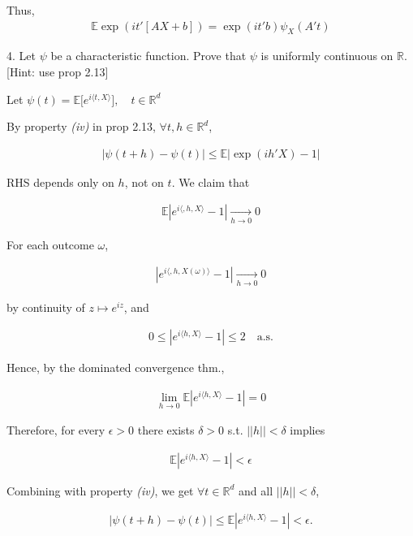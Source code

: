 \documentclass[10pt]{article}
\begin{document}
Thus,
\begin{gather*}
    \mathbb{E} \exp (it'[AX + b]) = \exp(it'b)\psi_X(A't)
\end{gather*}

\newpage

4. Let $\psi$ be a characteristic function. Prove that $\psi$ is uniformly continuous on $\mathbb{R}$. [Hint: use prop 2.13]

Let $\psi(t) = \mathbb{E}\big[e^{i\langle t, X\rangle}\big], \quad t \in \mathbb{R}^d$

By property \textit{(iv)} in prop 2.13, $\forall t, h \in \mathbb{R}^d$,

\begin{gather*}
    |\psi(t + h) - \psi(t)| \leq \mathbb{E}| \exp (ih'X) - 1|
\end{gather*}

RHS depends only on $h$, not on $t$. We claim that 

\begin{gather*}
    \mathbb{E}|e^{i\langle, h, X \rangle} - 1| \xrightarrow[h \to 0]{} 0
\end{gather*}

For each outcome $\omega$, 

\begin{gather*}
    |e^{i\langle, h, X(\omega) \rangle} - 1|\xrightarrow[h \to 0]{} 0
\end{gather*}

by continuity of $z \mapsto e^{iz}$, and 

\begin{gather*}
    0 \leq |e^{i \langle h, X\rangle} - 1| \leq 2 \quad\text{a.s.}
\end{gather*}

Hence, by the dominated convergence thm., 

\begin{gather*}
    \lim_{h \to 0}\mathbb{E}|e^{i \langle h, X\rangle} - 1| = 0
\end{gather*}

Therefore, for every $\epsilon > 0$ there exists $\delta > 0$ s.t. $||h|| < \delta$ implies

\begin{gather*}
    \mathbb{E}|e^{i \langle h, X\rangle} - 1| < \epsilon
\end{gather*}

Combining with property \textit{(iv)}, we get $\forall t \in \mathbb{R}^d$ and all $||h|| < \delta$,

\begin{gather*}
    |\psi(t + h) - \psi(t)| \leq \mathbb{E}|e^{i \langle h, X \rangle} - 1| < \epsilon.
\end{gather*}
\end{document}
